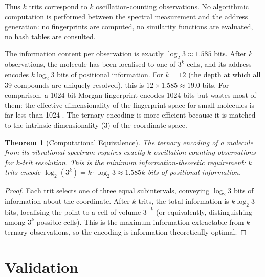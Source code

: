 \documentclass[11pt,twocolumn,a4paper]{article}
\newtheorem{theorem}{Theorem}[section]
\theoremstyle{definition}
\theoremstyle{remark}
\begin{document}
Thus $k$ trits correspond to $k$ oscillation-counting observations. No algorithmic computation is performed between the spectral measurement and the address generation: no fingerprints are computed, no similarity functions are evaluated, no hash tables are consulted.

The information content per observation is exactly $\log_2 3 \approx 1.585$ bits. After $k$ observations, the molecule has been localised to one of $3^k$ cells, and its address encodes $k \log_2 3$ bits of positional information. For $k = 12$ (the depth at which all 39 compounds are uniquely resolved), this is $12 \times 1.585 \approx 19.0$ bits. For comparison, a 1024-bit Morgan fingerprint encodes 1024 bits but wastes most of them: the effective dimensionality of the fingerprint space for small molecules is far less than 1024 \citep{riniker2013}. The ternary encoding is more efficient because it is matched to the intrinsic dimensionality (3) of the coordinate space.

\begin{theorem}[Computational Equivalence]
\label{thm:computational_equiv}
The ternary encoding of a molecule from its vibrational spectrum requires exactly $k$ oscillation-counting observations for $k$-trit resolution. This is the minimum information-theoretic requirement: $k$ trits encode $\log_2(3^k) = k \cdot \log_2 3 \approx 1.585k$ bits of positional information.
\end{theorem}

\begin{proof}
Each trit selects one of three equal subintervals, conveying $\log_2 3$ bits of information about the coordinate. After $k$ trits, the total information is $k \log_2 3$ bits, localising the point to a cell of volume $3^{-k}$ (or equivalently, distinguishing among $3^k$ possible cells). This is the maximum information extractable from $k$ ternary observations, so the encoding is information-theoretically optimal.
\end{proof}


\part{Validation}

\end{document}
